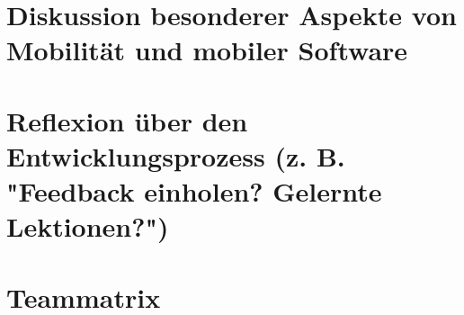 \documentclass[a4paper,11pt]{article}
\begin{document}
\section{Diskussion besonderer Aspekte von Mobilität und mobiler Software}


\section{Reflexion über den Entwicklungsprozess (z. B. "Feedback einholen? Gelernte Lektionen?")}


\section{Teammatrix}
\end{document}
